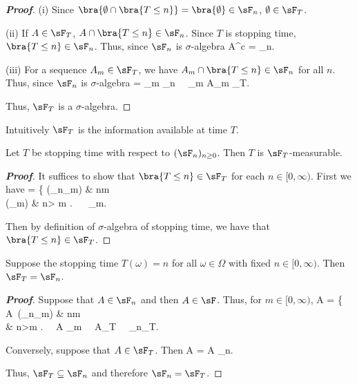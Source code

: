 \begin{proof}[\bf Proof]
\ben
\item [(i)] Since $\bra{\emptyset \cap \bra{T\leq n}} = \bra{\emptyset} \in \sF_n$, $\emptyset \in \sF_T$.
\item [(ii)] If $A\in \sF_T$, $A \cap \bra{T\leq n} \in \sF_n$. Since $T$ is stopping time, $\bra{T\leq n}\in \sF_n$. Thus, since $\sF_n$ is $\sigma$-algebra
\be
A^c \cap {} =  \bs {} \in \sF_n.
\ee
\item [(iii)] For a sequence $A_m \in \sF_T$, we have $A_m \cap \bra{T\leq n}\in \sF_n$ for all $n$. Thus, since $\sF_n$ is $\sigma$-algebra
\be
{} \cap {} = \bigcup_m  \in \sF_n  \ \ra \ \bigcup_m A_m \in \sF_T.
\ee
\een

Thus, $\sF_T$ is a $\sigma$-algebra.
\end{proof}

\begin{remark}
Intuitively $\sF_T$ is the information available at time $T$.%
\end{remark}
 
 
\begin{proposition}
Let $T$ be stopping time with respect to $(\sF_n)_{n\geq 0}$. Then $T$ is $\sF_T$-measurable.
\end{proposition}

\begin{proof}[\bf Proof]
It suffices to show that $\bra{T\leq n}\in \sF_T$ for each $n\in [0,\infty)$. First we have
\be
{}\cap {} = \left\{
 (\in \sF_n\subseteq \sF_m) \quad\quad & n\leq m \\
(\in \sF_m) & n> m
\ea
\right. \ \ra\ \cap {} \in \sF_m.
\ee 

Then by definition of $\sigma$-algebra of stopping time, we have that $\bra{T\leq n}\in \sF_T$.
\end{proof}


\begin{proposition}
Suppose the stopping time $T(\omega)=n$ for all $\omega \in \Omega$ with fixed $n\in [0,\infty)$. Then $\sF_T = \sF_n$. 
\end{proposition}

\begin{proof}[\bf Proof]
Suppose that $A\in \sF_n$ and then $A\in \sF$. Thus, for $m\in [0,\infty)$, 
\be
A\cap {} = \left\{
A\ (\in \sF_n\subseteq \sF_m) \quad\quad & n\leq m \\
\emptyset & n>m 
\ea\right. \ \ra\ A\cap {} \in \sF_m \ \ra\ A\in \sF_T \ \ra\ \sF_n\subseteq \sF_T.
\ee

Conversely, suppose that $A\in \sF_T$. Then
\be
A = A \cap {} \in \sF_n.
\ee

Thus, $\sF_T\subseteq \sF_n$ and therefore $\sF_n= \sF_T$.
\end{proof}



